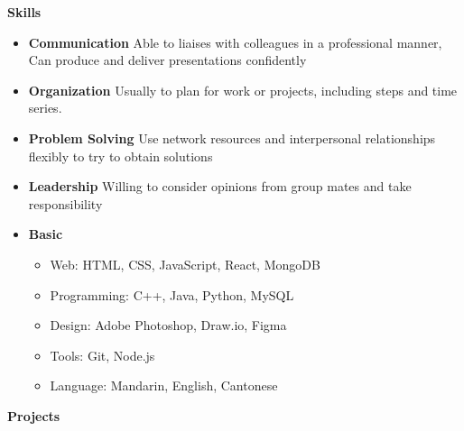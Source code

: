\documentclass[letterpaper,12pt]{article}[leftmargin=*]
\def \entryspacing {-0pt}
\renewcommand{\section}[2]{\vspace{5pt}
  \colorbox{secondary}{\color{white}\raggedbottom\normalsize\textbf{{#1}{\hspace{7pt}#2}}}
}
\newcommand{\resumeEntryStart}{\begin{itemize}[leftmargin=2.5mm]}
\newcommand{\resumeEntryEnd}{\end{itemize}\vspace{\entryspacing}}
\newcommand{\resumeItemListStart}{\begin{itemize}[leftmargin=4.5mm]}
\newcommand{\resumeItemListEnd}{\end{itemize}}
\newcommand{\resumeItem}[1]{
  \item\small{
    {#1 \vspace{-2pt}}
  }
}
\newcommand{\resumeEntryS}[2]{
  \item[]\small{
    \textbf{\color{primary}#1 }{ #2 \vspace{-6pt}}
  }
}
\begin{document}
\section{\faGears}{Skills}
 \resumeEntryStart
  \resumeEntryS{Communication } {Able to liaises with colleagues in a professional manner, Can produce and deliver presentations confidently}
      \resumeItemListStart
      \resumeItemListEnd
    \resumeEntryS{Organization } {Usually to plan for work or projects, including steps and time series.}
      \resumeItemListStart
      \resumeItemListEnd
    \resumeEntryS{Problem Solving } {Use network resources and interpersonal relationships flexibly to try to obtain solutions}
      \resumeItemListStart
      \resumeItemListEnd
    \resumeEntryS{Leadership } {Willing to consider opinions from group mates and take responsibility}
      \resumeItemListStart
      \resumeItemListEnd
  \resumeEntryS{Basic } {}
      \resumeItemListStart
      \resumeItem{Web: HTML, CSS, JavaScript, React, MongoDB}
      \resumeItem{Programming: C++, Java, Python, MySQL}
      \resumeItem{Design: Adobe Photoshop, Draw.io, Figma}
      \resumeItem{Tools: Git, Node.js}
      \resumeItem{Language: Mandarin, English, Cantonese}
      \resumeItemListEnd
 \resumeEntryEnd


\section{\faFlask}{Projects}
\end{document}
